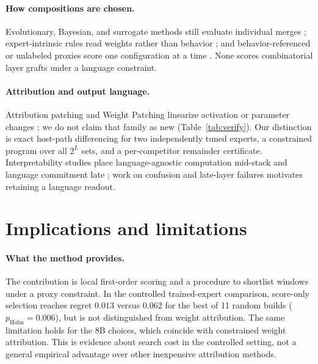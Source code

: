 \documentclass{article}
\theoremstyle{plain}
\theoremstyle{definition}
\theoremstyle{remark}
\begin{document}
\paragraph{How compositions are chosen.}
Evolutionary, Bayesian, and surrogate methods still evaluate individual merges
\citep{akiba2025evolutionary, merge3-2025, chen2025sipbmm, akizuki2025surrogate};
expert-intrinsic rules read weights rather than behavior
\citep{yadav2023ties, yu2024dare, jin2023regmean, liu2025sensmerging}; and
behavior-referenced or unlabeled proxies score one configuration at a time
\citep{yang2024adamerging, symerge2026, fu2026merit}. None scores
combinatorial layer grafts under a language constraint.

\paragraph{Attribution and output language.}
Attribution patching and Weight Patching linearize activation or parameter
changes \citep{nanda2023attribution, syed2024attribution, sun2026weightpatching};
we do not claim that family as new (Table~\ref{tab:verify}). Our distinction is
exact host-path differencing for two independently tuned experts, a constrained
program over all $2^L$ sets, and a per-competitor remainder certificate.
Interpretability studies place language-agnostic computation mid-stack and
language commitment late \citep{wendler2024llamas, tang2024langneurons,
schut2025english}; work on confusion and late-layer failures
\citep{marchisio2024confusion, nie2025confusion} motivates retaining a language
readout.

\section{Implications and limitations}
\label{sec:limitations}

\paragraph{What the method provides.}
The contribution is local first-order scoring and a procedure to shortlist
windows under a proxy constraint. In the controlled trained-expert comparison,
score-only selection reaches regret $0.013$ versus $0.062$ for the best of 11
random builds ($p_{\mathrm{Holm}}=0.006$), but is not distinguished from weight
attribution. The same limitation holds for the 8B choices, which coincide with
constrained weight attribution. This is evidence about search cost in the controlled setting,
not a general empirical advantage over other inexpensive attribution methods.
\end{document}
